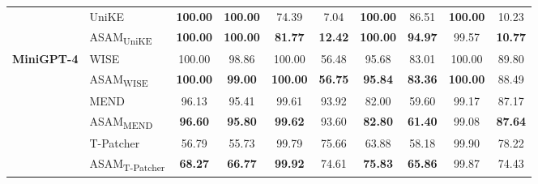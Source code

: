 \begin{table}[t]
\begin{tabular}{ll|cccc|cccc}
\cmidrule{2-10}
& UniKE & \textbf{100.00} & \textbf{100.00} & 74.39 & 7.04 & \textbf{100.00} & 86.51 & \textbf{100.00} & 10.23 \\
&\cellcolor[rgb]{0.949,0.949,0.949} ASAM\textsubscript{UniKE} &\cellcolor[rgb]{0.949,0.949,0.949} \textbf{100.00} &\cellcolor[rgb]{0.949,0.949,0.949} \textbf{100.00} &\cellcolor[rgb]{0.949,0.949,0.949} \textbf{81.77} &\cellcolor[rgb]{0.949,0.949,0.949} \textbf{12.42} &\cellcolor[rgb]{0.949,0.949,0.949} \textbf{100.00} &\cellcolor[rgb]{0.949,0.949,0.949} \textbf{94.97} &\cellcolor[rgb]{0.949,0.949,0.949} 99.57 &\cellcolor[rgb]{0.949,0.949,0.949} \textbf{10.77} \\
\midrule
\multirow{8}{1.7cm}{\centering\textbf{MiniGPT-4}} & WISE & 100.00 & 98.86 & 100.00 & 56.48 & 95.68 & 83.01 & 100.00 & 89.80 \\
&\cellcolor[rgb]{0.949,0.949,0.949} ASAM\textsubscript{WISE} &\cellcolor[rgb]{0.949,0.949,0.949} \textbf{100.00} &\cellcolor[rgb]{0.949,0.949,0.949} \textbf{99.00} &\cellcolor[rgb]{0.949,0.949,0.949} \textbf{100.00} &\cellcolor[rgb]{0.949,0.949,0.949} \textbf{56.75} &\cellcolor[rgb]{0.949,0.949,0.949} \textbf{95.84} &\cellcolor[rgb]{0.949,0.949,0.949} \textbf{83.36} &\cellcolor[rgb]{0.949,0.949,0.949} \textbf{100.00} &\cellcolor[rgb]{0.949,0.949,0.949} 88.49 \\
\cmidrule{2-10}
& MEND & 96.13 & 95.41 & 99.61 & 93.92 & 82.00 & 59.60 & 99.17 & 87.17 \\
&\cellcolor[rgb]{0.949,0.949,0.949} ASAM\textsubscript{MEND} &\cellcolor[rgb]{0.949,0.949,0.949} \textbf{96.60} &\cellcolor[rgb]{0.949,0.949,0.949} \textbf{95.80} &\cellcolor[rgb]{0.949,0.949,0.949} \textbf{99.62} &\cellcolor[rgb]{0.949,0.949,0.949} 93.60 &\cellcolor[rgb]{0.949,0.949,0.949} \textbf{82.80} &\cellcolor[rgb]{0.949,0.949,0.949} \textbf{61.40} &\cellcolor[rgb]{0.949,0.949,0.949} 99.08 &\cellcolor[rgb]{0.949,0.949,0.949} \textbf{87.64} \\
\cmidrule{2-10}
& T-Patcher & 56.79 & 55.73 & 99.79 & 75.66 & 63.88 & 58.18 & 99.90 & 78.22 \\
&\cellcolor[rgb]{0.949,0.949,0.949} ASAM\textsubscript{T-Patcher} &\cellcolor[rgb]{0.949,0.949,0.949} \textbf{68.27} &\cellcolor[rgb]{0.949,0.949,0.949} \textbf{66.77} &\cellcolor[rgb]{0.949,0.949,0.949} \textbf{99.92} &\cellcolor[rgb]{0.949,0.949,0.949} 74.61 &\cellcolor[rgb]{0.949,0.949,0.949} \textbf{75.83} &\cellcolor[rgb]{0.949,0.949,0.949} \textbf{65.86} &\cellcolor[rgb]{0.949,0.949,0.949} 99.87 &\cellcolor[rgb]{0.949,0.949,0.949} 74.43 \\

\end{tabular}
\end{table}
